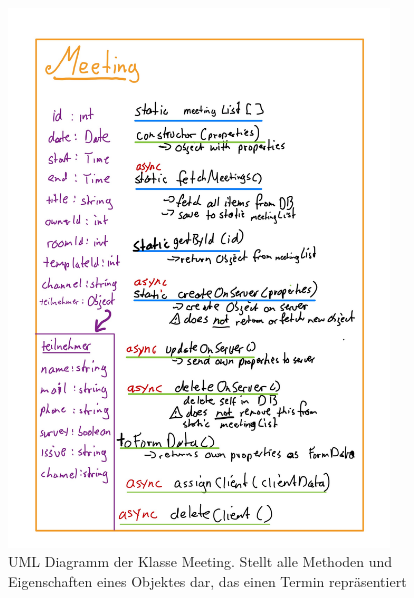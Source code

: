 \documentclass[12pt]{article}
\begin{document}
\begin{figure}[h]
    \caption{UML Diagramm der Klasse Meeting. Stellt alle Methoden und Eigenschaften eines Objektes dar, das einen Termin repräsentiert}
    \centering
    \includegraphics[width=0.9\textwidth]{uml_meeting.jpeg}
\end{figure}
\end{document}
